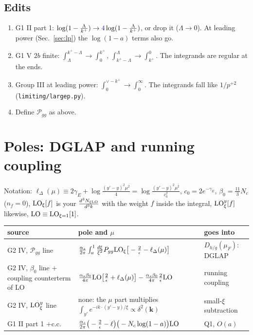 \documentclass[10pt]{article}
\numberwithin{equation}{section}
\newcommand{\new}[1]{{\color{blue}#1}}
\newcommand{\old}[1]{{\color{red}#1}}
\newcommand{\LO}{{\rm LO}}
\begin{document}
\subsection{Edits}\label{sec:edits}
\begin{enumerate}
\item[E1] G1 II part 1: $\log(1-\frac{\Lambda}{k^+})\to\new{4}\log(1-\frac{\Lambda}{k^+})$, or drop it ($\Lambda\to0$). At leading power (Sec.~\ref{sec:lp}) the $\log(1-a)$ terms also go.
\item[E2] G1 V $2b$ finite: \old{$\int_\Lambda^{k^+-\Lambda}$}$\to$\new{$\int_0^{k^+}$}, \old{$\int_{k^+-\Lambda}^{\Lambda}$}$\to$\new{$\int_{k^+}^{0}$}. The integrands are regular at the ends.
\item[E3] Group III at leading power: \old{$\int_0^{\vee-k^+}$}$\to$\new{$\int_0^\infty$}. The integrands fall like $1/p^{+2}$ (\texttt{limiting/largep.py}).
\item[E4] Define $\mathcal P_{gg}$ as above.
\end{enumerate}

\section{Poles: DGLAP and running coupling}\label{sec:poles}
Notation: $\ell_\Delta(\mu)\equiv2\gamma_E+\log\frac{(y'-y)^2\mu^2}{4}=\log\frac{(y'-y)^2\mu^2}{c_0^2}$, $c_0=2e^{-\gamma_E}$, $\beta_0=\frac{11}{3}N_c$ ($n_f=0$), $\LO_\xi[f]$ is your $\frac{d^3N_{\xi\rm LO}}{d^3k}$ with the weight $f$ inside the integral, $\LO^y_\xi[f]$ likewise, $\LO\equiv\LO_{\xi=1}[1]$.
\begin{center}\small
\begin{tabular}{@{}p{}p{}p{}@{}}\toprule
source & pole and $\mu$ & goes into\\\midrule
G2 IV, $\mathcal P_{gg}$ line & $\frac{\alpha_s}{2\pi}\int_a^1\frac{d\xi}{\xi^2}P_{gg}\LO_\xi\big[-\frac2\epsilon-\ell_\Delta(\mu)\big]$ & $D_{h/g}(\mu_F)$: DGLAP\\
G2 IV, $\beta_0$ line $+$ coupling counterterm of LO & $\frac{\alpha_s\beta_0}{4\pi}\LO\big[\frac2\epsilon+\ell_\Delta(\mu)\big]-\frac{\alpha_s\beta_0}{4\pi}\frac2\epsilon\LO$ & running coupling\\
G2 IV, $\LO^y_\xi$ line & none: the $\mu$ part multiplies $\int_{y'}e^{-ik\cdot(y'-y)/\xi}\propto\delta^2(\mathbf k)$ & small-$\xi$ subtraction\\
G1 II part 1 $+$c.c. & $\frac{\alpha_s}{2\pi}\big(-\frac2\epsilon-\ell\big)\big(-N_c\log(1-a)\big)\LO$ & Q1, $O(a)$\\\bottomrule
\end{tabular}
\end{center}
\end{document}

